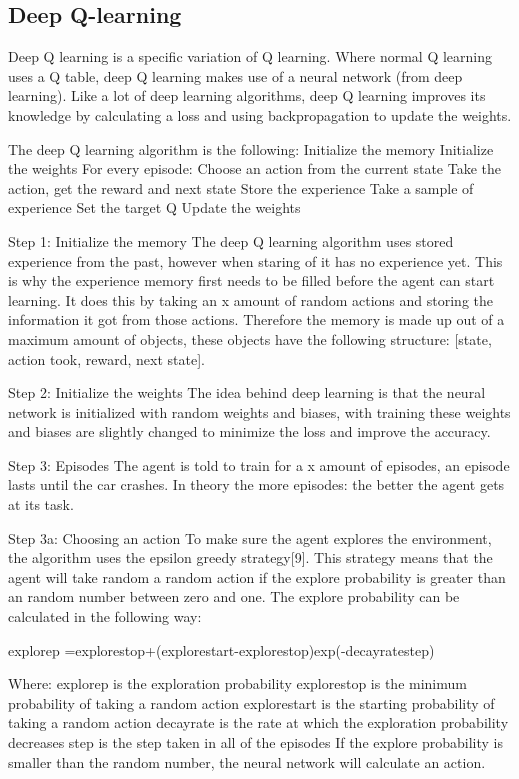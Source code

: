 \documentclass{article}
\begin{document}
\subsection{Deep Q-learning}
Deep Q learning is a specific variation of Q learning. Where normal Q learning uses a Q table, deep Q learning makes use of a neural network (from deep learning). Like a lot of deep learning algorithms, deep Q learning improves its knowledge by calculating a loss and using backpropagation to update the weights. 

The deep Q learning algorithm is the following:
Initialize the memory
Initialize the weights 
For every episode:
Choose an action from the current state
Take the action, get the reward and next state
Store the experience
Take a sample of experience
Set the target Q
Update the weights

Step 1: Initialize the memory
The deep Q learning algorithm uses stored experience from the past, however when staring of it has no experience yet. This is why the experience memory first needs to be filled before the agent can start learning. It does this by taking an x amount of random actions and storing the information it got from those actions. Therefore the memory is made up out of a maximum amount of objects, these objects have the following structure: 
[state, action took, reward, next state].

Step 2: Initialize the weights
The idea behind deep learning is that the neural network is initialized with random weights and biases, with training these weights and biases are slightly changed to minimize the loss and improve the accuracy. 

Step 3: Episodes
The agent is told to train for a x amount of episodes, an episode lasts until the car crashes. In theory the more episodes: the better the agent gets at its task.

Step 3a: Choosing an action 
To make sure the agent explores the environment, the algorithm uses the epsilon greedy strategy[9]. This strategy means that the agent will take random a random action if the explore probability is greater than an random number between zero and one. The explore probability can be calculated in the following way: 

explorep =explorestop+(explorestart-explorestop)exp(-decayratestep)

Where:
explorep is the exploration probability 
explorestop is the minimum probability of taking a random action
explorestart is the starting probability of taking a random action
decayrate is the rate at which the exploration probability decreases
step is the step taken in all of the episodes
If the explore probability is smaller than the random number, the neural network will calculate an action.
\end{document}
